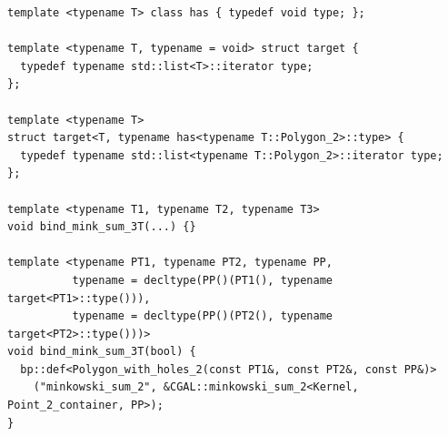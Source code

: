 \begin{lstfloat}
\begin{lstlisting}[style=cppFramedStyle,basicstyle=\scriptsize,label=minkSumResolution,caption={Automatic generation of binding for \cppLstinline{CGAL::minkowski_sum_2} exploiting SFINAE.}]
template <typename T> class has { typedef void type; };

template <typename T, typename = void> struct target {
  typedef typename std::list<T>::iterator type;
};

template <typename T>
struct target<T, typename has<typename T::Polygon_2>::type> {
  typedef typename std::list<typename T::Polygon_2>::iterator type;
};

template <typename T1, typename T2, typename T3>
void bind_mink_sum_3T(...) {}

template <typename PT1, typename PT2, typename PP,
          typename = decltype(PP()(PT1(), typename target<PT1>::type())),
          typename = decltype(PP()(PT2(), typename target<PT2>::type()))>
void bind_mink_sum_3T(bool) {
  bp::def<Polygon_with_holes_2(const PT1&, const PT2&, const PP&)>
    ("minkowski_sum_2", &CGAL::minkowski_sum_2<Kernel, Point_2_container, PP>);
}
\end{lstlisting}
\end{lstfloat}

